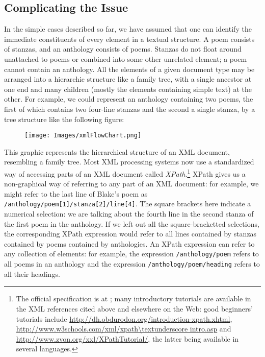 \subsection[{Complicating the Issue}]{Complicating the Issue}\label{SG152}\par
In the simple cases described so far, we have assumed that one can identify the immediate constituents of every element in a textual structure. A poem consists of stanzas, and an anthology consists of poems. Stanzas do not float around unattached to poems or combined into some other unrelated element; a poem cannot contain an anthology. All the elements of a given document type may be arranged into a hierarchic structure like a family tree, with a single ancestor at one end and many children (mostly the elements containing simple text) at the other. For example, we could represent an anthology containing two poems, the first of which contains two four-line stanzas and the second a single stanza, by a tree structure like the following figure:\begin{figure}[htbp]
\noindent\noindent\texttt{[image: Images/xmlFlowChart.png]}\end{figure}
\par
This graphic represents the hierarchical structure of an XML document, resembling a family tree. Most XML processing systems now use a standardized way of accessing parts of an XML document called \textit{XPath}.\footnote{The official specification is at \cite{XPATH}; many introductory tutorials are available in the XML references cited above and elsewhere on the Web: good beginners' tutorials include \url{http://dh.obdurodon.org/introduction-xpath.xhtml}, \url{http://www.w3schools.com/xml/xpath\textunderscore intro.asp} and \url{http://www.zvon.org/xxl/XPathTutorial/}, the latter being available in several languages.} XPath gives us a non-graphical way of referring to any part of an XML document: for example, we might refer to the last line of Blake's poem as \texttt{/anthology/poem[1]/stanza[2]/line[4]}. The square brackets here indicate a numerical selection: we are talking about the fourth line in the second stanza of the first poem in the anthology. If we left out all the square-bracketted selections, the corresponding XPath expression would refer to all lines contained by stanzas contained by poems contained by anthologies. An XPath expression can refer to any collection of elements: for example, the expression \texttt{/anthology/poem} refers to all poems in an anthology and the expression \texttt{/anthology/poem/heading} refers to all their headings.\par
